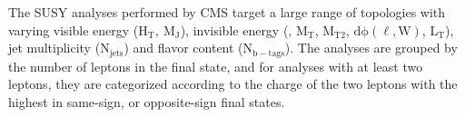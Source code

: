 The SUSY analyses performed by CMS target a large range of topologies with varying
visible energy ($\mathrm{H_T,~M_J}$), 
invisible energy (\MET,
$\mathrm{M_T}$,
$\mathrm{M_{T2}}$,
$\mathrm{d\phi(\ell, W)}$,
$\mathrm{L_T}$),
jet multiplicity ($\mathrm{N_{jets}}$)
and flavor content ($\mathrm{N_{b-tags}}$).
The analyses are grouped by the number of leptons in the final state,
and for analyses with at least two leptons,
they are categorized according to the charge of the two leptons with the highest \pt
in same-sign, or opposite-sign final states.
